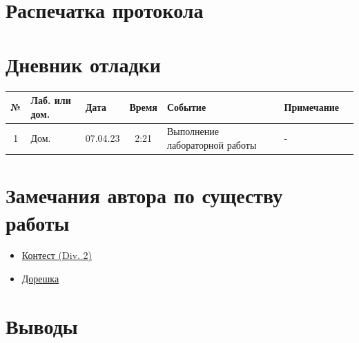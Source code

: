 \documentclass[12pt, letterpaper]{article}
\begin{document}
\section{Распечатка протокола}
\section{Дневник отладки}
\begin{tabular}{|c|p{1cm}|p{1.5cm}|c|p{2.5cm}|p{2cm}|p{2.25cm}|}
    \hline
    № & Лаб. или дом. & Дата & Время & Событие & Примечание\\
    \hline
    1 & Дом. & 07.04.23 & 2:21 & Выполнение лабораторной работы & -\\
    \hline
\end{tabular}
\section{Замечания автора по существу работы}
\begin{itemize}
\item \href{https://codeforces.com/contest/1798/submission/199301228}{Контест (Div. 2)}
\item \href{}{Дорешка}
\end{itemize}
\section{Выводы}
\end{document}
